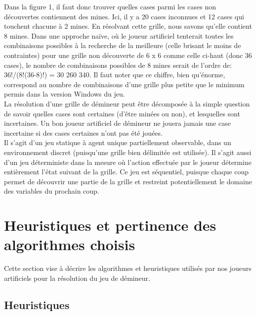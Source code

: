 \documentclass{article}
\begin{document}
Dans la figure 1, il faut donc trouver quelles cases parmi les cases non découvertes contiennent des mines. Ici, il y a 
20 cases inconnues et 12 cases qui touchent chacune à 2 mines. En résolvant cette grille, 
nous savons qu’elle contient 8 mines. Dans une approche naïve, où le joueur artificiel 
tenterait toutes les combinaisons possibles à la recherche de la meilleure 
(celle brisant le moins de contraintes) pour une grille non découverte de 6 x 6 
comme celle ci-haut (donc 36 cases), le nombre de combinaisons possibles de 8 mines serait de l’ordre de:
36!/(8!(36-8)!) = 30 260 340. 
Il faut noter que ce chiffre, bien qu’énorme, correspond au nombre de combinaisons d’une grille 
plus petite que le minimum permis dans la version Windows du jeu. \\

La résolution d’une grille de démineur peut être décomposée à la simple question de savoir quelles 
cases sont certaines (d’être minées ou non), et lesquelles sont incertaines. Un bon joueur 
artificiel de démineur ne jouera jamais une case incertaine si des cases certaines 
n’ont pas été jouées. \\

Il s’agit d’un jeu statique à agent unique partiellement observable, dans un environnement 
discret (puisqu’une grille bien délimitée est utilisée). Il s’agit aussi d’un jeu 
déterministe dans la mesure où l’action effectuée par le joueur détermine entièrement 
l’état suivant de la grille. Ce jeu est séquentiel, puisque chaque coup permet de 
découvrir une partie de la grille et restreint potentiellement le domaine des variables du prochain coup.

\section{Heuristiques et pertinence des algorithmes choisis}

Cette section vise à décrire les algorithmes et heuristiques utilisés par nos joueurs artificiels pour
la résolution du jeu de démineur.

\subsection{Heuristiques}
\end{document}
